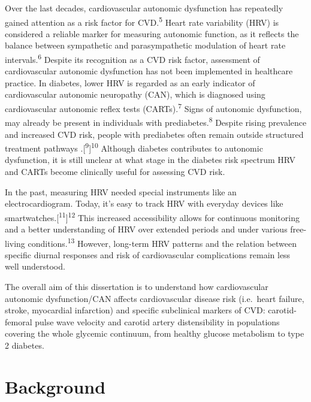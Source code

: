 \documentclass[
  letterpaper,
  headsepline=true,
  open=any]{scrbook}
\begin{document}
Over the last decades, cardiovascular autonomic dysfunction has
repeatedly gained attention as a risk factor for CVD.\textsuperscript{5}
Heart rate variability (HRV) is considered a reliable marker for
measuring autonomic function, as it reflects the balance between
sympathetic and parasympathetic modulation of heart rate
intervals.\textsuperscript{6} Despite its recognition as a CVD risk
factor, assessment of cardiovascular autonomic dysfunction has not been
implemented in healthcare practice. In diabetes, lower HRV is regarded
as an early indicator of cardiovascular autonomic neuropathy (CAN),
which is diagnosed using cardiovascular autonomic reflex tests
(CARTs).\textsuperscript{7} Signs of autonomic dysfunction, may already
be present in individuals with prediabetes.\textsuperscript{8} Despite
rising prevalence and increased CVD risk, people with prediabetes often
remain outside structured treatment pathways
.{[}\textsuperscript{9}{]}\textsuperscript{10} Although diabetes
contributes to autonomic dysfunction, it is still unclear at what stage
in the diabetes risk spectrum HRV and CARTs become clinically useful for
assessing CVD risk.

In the past, measuring HRV needed special instruments like an
electrocardiogram. Today, it's easy to track HRV with everyday devices
like smartwatches.{[}\textsuperscript{11}{]}\textsuperscript{12} This
increased accessibility allows for continuous monitoring and a better
understanding of HRV over extended periods and under various free-living
conditions.\textsuperscript{13} However, long-term HRV patterns and the
relation between specific diurnal responses and risk of cardiovascular
complications remain less well understood.

The overall aim of this dissertation is to understand how cardiovascular
autonomic dysfunction/CAN affects cardiovascular disease risk
(i.e.~heart failure, stroke, myocardial infarction) and specific
subclinical markers of CVD: carotid-femoral pulse wave velocity and
carotid artery distensibility in populations covering the whole glycemic
continuum, from healthy glucose metabolism to type 2 diabetes.


\hypertarget{background}{%
\chapter{Background}\label{background}}

\newpage
\end{document}
